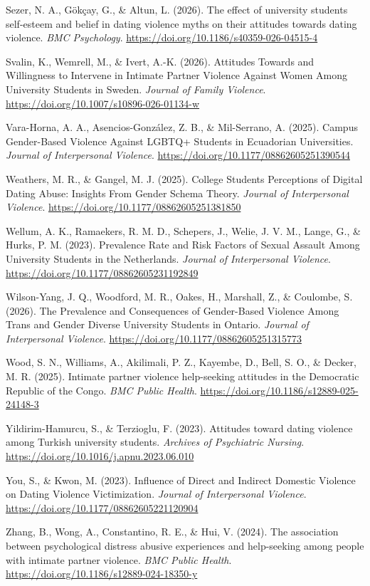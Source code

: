 \documentclass[
  spanish,
  11pt,
  letterpaper,
  DIV=11,
  numbers=noendperiod]{scrreprt}
\newlength{\cslhangindent}
\newenvironment{CSLReferences}[2] %
 {\begin{list}{}{%
  \setlength{\itemindent}{0pt}
  \setlength{\leftmargin}{0pt}
  \setlength{\parsep}{0pt}
  \ifodd #1
   \setlength{\leftmargin}{\cslhangindent}
   \setlength{\itemindent}{-1\cslhangindent}
  \fi
  \setlength{\itemsep}{#2\baselineskip}}}
 {\end{list}}
\begin{document}
\begin{CSLReferences}{1}{0}
Sezer, N. A., Gökçay, G., \& Altun, L. (2026). The effect of university
students self-esteem and belief in dating violence myths on their
attitudes towards dating violence. \emph{BMC Psychology}.
\url{https://doi.org/10.1186/s40359-026-04515-4}

Svalin, K., Wemrell, M., \& Ivert, A.-K. (2026). Attitudes Towards and
Willingness to Intervene in Intimate Partner Violence Against Women
Among University Students in Sweden. \emph{Journal of Family Violence}.
\url{https://doi.org/10.1007/s10896-026-01134-w}

Vara-Horna, A. A., Asencios-González, Z. B., \& Mil-Serrano, A. (2025).
Campus Gender-Based Violence Against LGBTQ+ Students in Ecuadorian
Universities. \emph{Journal of Interpersonal Violence}.
\url{https://doi.org/10.1177/08862605251390544}

Weathers, M. R., \& Gangel, M. J. (2025). College Students Perceptions
of Digital Dating Abuse: Insights From Gender Schema Theory.
\emph{Journal of Interpersonal Violence}.
\url{https://doi.org/10.1177/08862605251381850}

Wellum, A. K., Ramaekers, R. M. D., Schepers, J., Welie, J. V. M.,
Lange, G., \& Hurks, P. M. (2023). Prevalence Rate and Risk Factors of
Sexual Assault Among University Students in the Netherlands.
\emph{Journal of Interpersonal Violence}.
\url{https://doi.org/10.1177/08862605231192849}

Wilson-Yang, J. Q., Woodford, M. R., Oakes, H., Marshall, Z., \&
Coulombe, S. (2026). The Prevalence and Consequences of Gender-Based
Violence Among Trans and Gender Diverse University Students in Ontario.
\emph{Journal of Interpersonal Violence}.
\url{https://doi.org/10.1177/08862605251315773}

Wood, S. N., Williams, A., Akilimali, P. Z., Kayembe, D., Bell, S. O.,
\& Decker, M. R. (2025). Intimate partner violence help-seeking
attitudes in the Democratic Republic of the Congo. \emph{BMC Public
Health}. \url{https://doi.org/10.1186/s12889-025-24148-3}

Yildirim-Hamurcu, S., \& Terzioglu, F. (2023). Attitudes toward dating
violence among Turkish university students. \emph{Archives of
Psychiatric Nursing}. \url{https://doi.org/10.1016/j.apnu.2023.06.010}

You, S., \& Kwon, M. (2023). Influence of Direct and Indirect Domestic
Violence on Dating Violence Victimization. \emph{Journal of
Interpersonal Violence}. \url{https://doi.org/10.1177/08862605221120904}

Zhang, B., Wong, A., Constantino, R. E., \& Hui, V. (2024). The
association between psychological distress abusive experiences and
help-seeking among people with intimate partner violence. \emph{BMC
Public Health}. \url{https://doi.org/10.1186/s12889-024-18350-y}

\end{CSLReferences}
\end{document}
